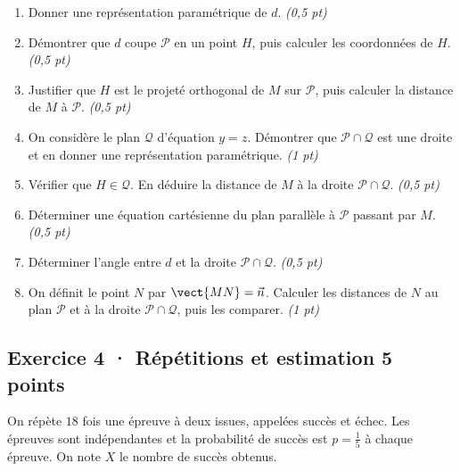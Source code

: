 \begin{enumerate}

\item Donner une représentation paramétrique de $d$. \hfill\textit{(0,5 pt)}

\item Démontrer que $d$ coupe $\mathcal P$ en un point $H$, puis calculer les coordonnées de $H$. \hfill\textit{(0,5 pt)}

\item Justifier que $H$ est le projeté orthogonal de $M$ sur $\mathcal P$, puis calculer la distance de $M$ à $\mathcal P$. \hfill\textit{(0,5 pt)}

\item On considère le plan $\mathcal Q$ d'équation $y=z$. Démontrer que $\mathcal P\cap\mathcal Q$ est une droite et en donner une représentation paramétrique. \hfill\textit{(1 pt)}

\item Vérifier que $H\in\mathcal Q$. En déduire la distance de $M$ à la droite $\mathcal P\cap\mathcal Q$. \hfill\textit{(0,5 pt)}

\item Déterminer une équation cartésienne du plan parallèle à $\mathcal P$ passant par $M$. \hfill\textit{(0,5 pt)}

\item Déterminer l'angle entre $d$ et la droite $\mathcal P\cap\mathcal Q$. \hfill\textit{(0,5 pt)}

\item On définit le point $N$ par $\vect{MN}=\vec n$. Calculer les distances de $N$ au plan $\mathcal P$ et à la droite $\mathcal P\cap\mathcal Q$, puis les comparer. \hfill\textit{(1 pt)}

\end{enumerate}

\subsection*{Exercice 4 · Répétitions et estimation \hfill 5 points}On répète $18$ fois une épreuve à deux issues, appelées succès et échec. Les épreuves sont indépendantes et la probabilité de succès est $p=\frac{1}{5}$ à chaque épreuve. On note $X$ le nombre de succès obtenus.

